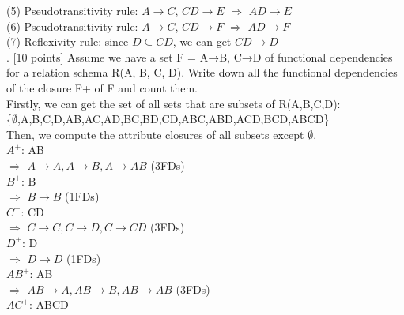 \documentclass[]{article}
\begin{document}
	(5) Pseudotransitivity rule: $A\rightarrow C$, $CD\rightarrow E$ $\Longrightarrow$  $AD\rightarrow E$   \\
	
	(6) Pseudotransitivity rule: $A\rightarrow C$, $CD\rightarrow F$ $\Longrightarrow$  $AD\rightarrow F$   \\
	
	(7) Reflexivity rule: since $D\subseteq CD$, we can get $CD\rightarrow D$  \\
	
	. [10 points] Assume we have a set F = {A→B, C→D} of functional dependencies for a relation schema R(A, B, C, D). Write down all the functional dependencies of the closure F+ of F and count them.   \\
	
	\noindent Firstly, we can get the set of all sets that are subsets of R(A,B,C,D):  \\
	
	\{$\emptyset$,A,B,C,D,AB,AC,AD,BC,BD,CD,ABC,ABD,ACD,BCD,ABCD\} \\
	
	\noindent Then, we compute the attribute closures of all subsets except $\emptyset$.   \\
	
	$A^{+}$: AB  \\
	
	$\Longrightarrow$ $A\rightarrow A, A\rightarrow B, A\rightarrow AB$ (3FDs)  \\
	
	$B^{+}$: B  \\
	
	$\Longrightarrow$ $B\rightarrow B$ (1FDs)  \\
	
	$C^{+}$: CD  \\
	
	$\Longrightarrow$ $C\rightarrow C, C\rightarrow D, C\rightarrow CD$ (3FDs)  \\
	
	$D^{+}$: D  \\
	
	$\Longrightarrow$ $D\rightarrow D$ (1FDs)  \\
	
	$AB^{+}$: AB  \\
	
	$\Longrightarrow$ $AB\rightarrow A, AB\rightarrow B, AB\rightarrow AB$ (3FDs)  \\
	
	$AC^{+}$: ABCD  \\
	
\end{document}
